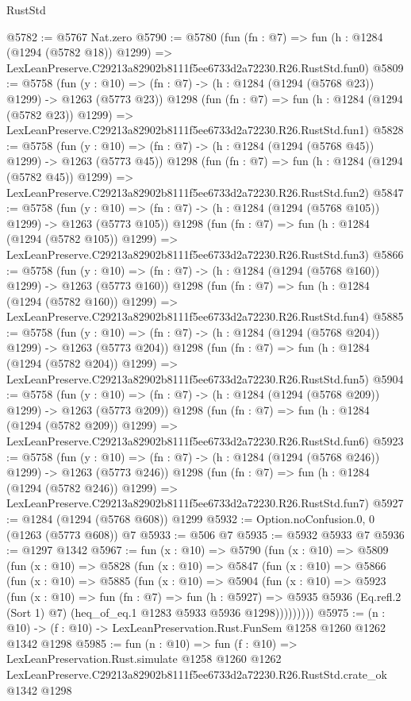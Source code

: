 \begin{lexlean}{RustStd}
\begin{coremodule}
@5782 := @5767 Nat.zero
@5790 := @5780
    (fun (fn : @7) =>
    fun (h : @1284 (@1294 (@5782 @18)) @1299) =>
    LexLeanPreserve.C29213a82902b8111f5ee6733d2a72230.R26.RustStd.fun0)
@5809 := @5758
    (fun (y : @10) => (fn : @7) -> (h : @1284 (@1294 (@5768 @23)) @1299) -> @1263 (@5773 @23))
    @1298
    (fun (fn : @7) =>
    fun (h : @1284 (@1294 (@5782 @23)) @1299) =>
    LexLeanPreserve.C29213a82902b8111f5ee6733d2a72230.R26.RustStd.fun1)
@5828 := @5758
    (fun (y : @10) => (fn : @7) -> (h : @1284 (@1294 (@5768 @45)) @1299) -> @1263 (@5773 @45))
    @1298
    (fun (fn : @7) =>
    fun (h : @1284 (@1294 (@5782 @45)) @1299) =>
    LexLeanPreserve.C29213a82902b8111f5ee6733d2a72230.R26.RustStd.fun2)
@5847 := @5758
    (fun (y : @10) => (fn : @7) -> (h : @1284 (@1294 (@5768 @105)) @1299) -> @1263 (@5773 @105))
    @1298
    (fun (fn : @7) =>
    fun (h : @1284 (@1294 (@5782 @105)) @1299) =>
    LexLeanPreserve.C29213a82902b8111f5ee6733d2a72230.R26.RustStd.fun3)
@5866 := @5758
    (fun (y : @10) => (fn : @7) -> (h : @1284 (@1294 (@5768 @160)) @1299) -> @1263 (@5773 @160))
    @1298
    (fun (fn : @7) =>
    fun (h : @1284 (@1294 (@5782 @160)) @1299) =>
    LexLeanPreserve.C29213a82902b8111f5ee6733d2a72230.R26.RustStd.fun4)
@5885 := @5758
    (fun (y : @10) => (fn : @7) -> (h : @1284 (@1294 (@5768 @204)) @1299) -> @1263 (@5773 @204))
    @1298
    (fun (fn : @7) =>
    fun (h : @1284 (@1294 (@5782 @204)) @1299) =>
    LexLeanPreserve.C29213a82902b8111f5ee6733d2a72230.R26.RustStd.fun5)
@5904 := @5758
    (fun (y : @10) => (fn : @7) -> (h : @1284 (@1294 (@5768 @209)) @1299) -> @1263 (@5773 @209))
    @1298
    (fun (fn : @7) =>
    fun (h : @1284 (@1294 (@5782 @209)) @1299) =>
    LexLeanPreserve.C29213a82902b8111f5ee6733d2a72230.R26.RustStd.fun6)
@5923 := @5758
    (fun (y : @10) => (fn : @7) -> (h : @1284 (@1294 (@5768 @246)) @1299) -> @1263 (@5773 @246))
    @1298
    (fun (fn : @7) =>
    fun (h : @1284 (@1294 (@5782 @246)) @1299) =>
    LexLeanPreserve.C29213a82902b8111f5ee6733d2a72230.R26.RustStd.fun7)
@5927 := @1284 (@1294 (@5768 @608)) @1299
@5932 := Option.noConfusion.{0, 0} (@1263 (@5773 @608)) @7
@5933 := @506 @7
@5935 := @5932 @5933 @7
@5936 := @1297 @1342
@5967 := fun (x : @10) =>
  @5790
    (fun (x : @10) =>
    @5809
      (fun (x : @10) =>
      @5828
        (fun (x : @10) =>
        @5847
          (fun (x : @10) =>
          @5866
            (fun (x : @10) =>
            @5885
              (fun (x : @10) =>
              @5904
                (fun (x : @10) =>
                @5923
                  (fun (x : @10) =>
                  fun (fn : @7) =>
                  fun (h : @5927) =>
                  @5935
                    @5936
                    (Eq.refl.{2} (Sort 1) @7)
                    (heq_of_eq.{1} @1283 @5933 @5936 @1298)))))))))
@5975 := (n : @10) -> (f : @10) -> LexLeanPreservation.Rust.FunSem @1258 @1260 @1262 @1342 @1298
@5985 := fun (n : @10) =>
  fun (f : @10) =>
  LexLeanPreservation.Rust.simulate
    @1258
    @1260
    @1262
    LexLeanPreserve.C29213a82902b8111f5ee6733d2a72230.R26.RustStd.crate_ok
    @1342
    @1298
\end{coremodule}
\end{lexlean}
